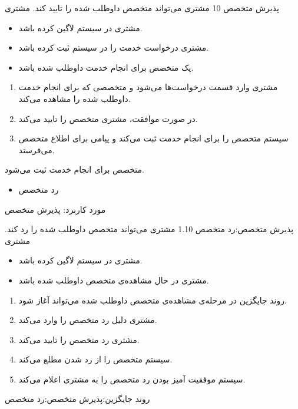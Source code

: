{
\usecase
{پذیرش متخصص}
{10}
{مشتری می‌تواند متخصص داوطلب شده را تایید کند.}
{مشتری}
{}
{	
	\begin{itemize}
		\vspace*{-0.6cm}
		\item 
		مشتری در سیستم لاگین کرده باشد.
		\item
		مشتری درخواست خدمت را در سیستم ثبت کرده باشد.
		\item
		یک متخصص برای انجام خدمت داوطلب شده باشد.
	\end{itemize}
}
{
	\vspace*{-0.6cm}
	\begin{enumerate}
		\item 
		مشتری وارد قسمت درخواست‌ها می‌شود و متخصصی که برای انجام خدمت داوطلب شده را مشاهده می‌کند.
		\item 
		در صورت موافقت، مشتری متخصص را تایید می‌کند.
		\item 
		سیستم متخصص را برای انجام خدمت ثبت می‌کند و پیامی برای اطلاع متخصص می‌فرستد.
	\end{enumerate}
}
{متخصص برای انجام خدمت ثبت می‌شود.}
{
	\begin{itemize}
		\vspace*{-0.6cm}
		\item
		رد متخصص
	\end{itemize}
}
{
	مورد کاربرد: پذیرش متخصص
}

\alternativeflow
{
	 پذیرش متخصص:رد متخصص
}
{1.10}
{
	مشتری می‌تواند متخصص داوطلب شده را رد کند.
}
{
	مشتری
}
{}
{
	\begin{itemize}
		\vspace*{-0.6cm}
		\item 
		مشتری در سیستم لاگین کرده باشد.
		\item
		مشتری در حال مشاهده‌ی متخصص داوطلب شده باشد.
	\end{itemize}
}
{
	\vspace*{-0.6cm}
	\begin{enumerate}
		\item 
		روند جایگزین در مرحله‌ی مشاهده‌ی متخصص داوطلب شده می‌تواند آغاز شود.
		\item
		مشتری دلیل رد متخصص را وارد می‌کند.
		\item
		مشتری رد متخصص را تایید می‌کند.
		\item
		سیستم متخصص را از رد شدن مطلع می‌کند.
		\item
		سیستم موفقیت آمیز بودن رد متخصص را به مشتری اعلام می‌کند.
	\end{enumerate}
}
{
}
{
روند جایگزین:پذیرش متخصص:رد متخصص
}
}


